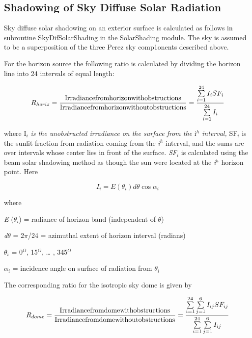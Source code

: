 \subsection{Shadowing of Sky Diffuse Solar Radiation}\label{shadowing-of-sky-diffuse-solar-radiation}

Sky diffuse solar shadowing on an exterior surface is calculated as follows in subroutine SkyDifSolarShading in the SolarShading module. The sky is assumed to be a superposition of the three Perez sky comp1onents described above.

For the horizon source the following ratio is calculated by dividing the horizon line into 24 intervals of equal length:

\begin{equation}
{R_{horiz}} = \frac{{{\rm{Irradiance from horizon with obstructions}}}}{{{\rm{Irradiance from horizon without obstructions}}}} = \frac{{\sum\limits_{i = 1}^{24} {{I_i}S{F_i}} }}{{\sum\limits_{i = 1}^{24} {{I_i}} }}
\end{equation}

where I\(_{i}\) \emph{is the unobstructed irradiance on the surface from the} i\emph{\(^{h}\) interval,} SF\(_{i}\) is the sunlit fraction from radiation coming from the \emph{i}\(^{h}\) interval, and the sums are over intervals whose center lies in front of the surface. \emph{SF\(_{i}\)} is calculated using the beam solar shadowing method as though the sun were located at the \emph{i}\(^{h}\) horizon point. Here

\begin{equation}
{I_i} = E({\theta_i})d\theta \cos {\alpha_i}
\end{equation}

where

\emph{E} (\emph{$\theta$\(_{i}\)}) = radiance of horizon band (independent of $\theta$)

\emph{d$\theta$} = 2$\pi$/24 = azimuthal extent of horizon interval (radians)

\emph{$\theta$\(_{i}\)} = 0\(^{O}\), 15\(^{O}\), \ldots{} , 345\(^{O}\)

$\alpha$\(_{i}\) = incidence angle on surface of radiation from \emph{$\theta$\(_{i}\)}

The corresponding ratio for the isotropic sky dome is given by

\begin{equation}
{R_{dome}} = \frac{{{\rm{Irradiance from dome with obstructions}}}}{{{\rm{Irradiance from dome without obstructions}}}} = \frac{{\sum\limits_{i = 1}^{24} {\sum\limits_{j = 1}^6 {{I_{ij}}S{F_{ij}}} } }}{{\sum\limits_{i = 1}^{24} {\sum\limits_{j = 1}^6 {{I_{ij}}} } }}
\end{equation}

